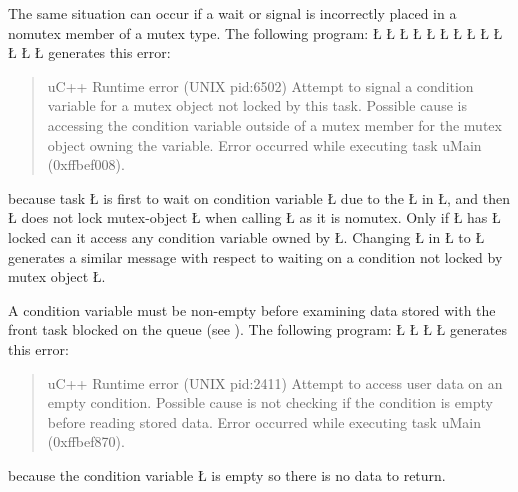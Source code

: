 \documentclass[openright,twoside]{report}
\begin{document}
The same situation can occur if a wait or signal is incorrectly placed in a nomutex member of a mutex type.
The following program:
\LGinlinefalse\LGbegin\lgrinde
\L{}
\L{\LB{}}
\L{\LB{}}
\L{}
\L{\LB{}}
\L{\LB{}}
\L{\LB{}}
\L{\LB{\};}}
\endlgrinde\LGend
\LGinlinefalse\LGbegin\lgrinde
\L{}
\L{\LB{}}
\L{\LB{}}
\L{\LB{}}
\L{\LB{\}}}
\endlgrinde\LGend
generates this error:
\begin{quote}
\BGfont
uC++ Runtime error (UNIX pid:6502) Attempt to signal a condition variable for a mutex object not locked by this task.
Possible cause is accessing the condition variable outside of a mutex member for the mutex object owning the variable.
Error occurred while executing task uMain (0xffbef008).
\end{quote}
because task \LGinlinetrue\LGbegin\lgrinde\L{}\endlgrinde\LGend{} is first to wait on condition variable \LGinlinetrue\LGbegin\lgrinde\L{}\endlgrinde\LGend{} due to the \LGinlinetrue\LGbegin\lgrinde\L{}\endlgrinde\LGend{} in \LGinlinetrue\LGbegin\lgrinde\L{}\endlgrinde\LGend{}, and then \LGinlinetrue\LGbegin\lgrinde\L{}\endlgrinde\LGend{} does not lock mutex-object \LGinlinetrue\LGbegin\lgrinde\L{}\endlgrinde\LGend{} when calling \LGinlinetrue\LGbegin\lgrinde\L{}\endlgrinde\LGend{} as it is nomutex.
Only if \LGinlinetrue\LGbegin\lgrinde\L{}\endlgrinde\LGend{} has \LGinlinetrue\LGbegin\lgrinde\L{}\endlgrinde\LGend{} locked can it access any condition variable owned by \LGinlinetrue\LGbegin\lgrinde\L{}\endlgrinde\LGend{}.
Changing \LGinlinetrue\LGbegin\lgrinde\L{}\endlgrinde\LGend{} in \LGinlinetrue\LGbegin\lgrinde\L{}\endlgrinde\LGend{} to \LGinlinetrue\LGbegin\lgrinde\L{}\endlgrinde\LGend{} generates a similar message with respect to waiting on a condition not locked by mutex object \LGinlinetrue\LGbegin\lgrinde\L{}\endlgrinde\LGend{}.

A condition variable must be non-empty before examining data stored with the front task blocked on the queue (see ).
The following program:
\LGinlinefalse\LGbegin\lgrinde
\L{}
\L{\LB{}}
\L{\LB{}}
\L{\LB{\}}}
\endlgrinde\LGend
generates this error:
\begin{quote}
\BGfont
uC++ Runtime error (UNIX pid:2411) Attempt to access user data on an empty condition.
Possible cause is not checking if the condition is empty before reading stored data.
Error occurred while executing task uMain (0xffbef870).
\end{quote}
because the condition variable \LGinlinetrue\LGbegin\lgrinde\L{}\endlgrinde\LGend{} is empty so there is no data to return.
\end{document}
